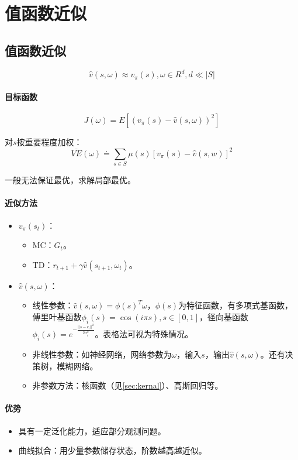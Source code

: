 \documentclass[
12pt, %
a4paper, 
oneside, %
headinclude,footinclude, %
]{scrartcl}
\begin{document}
\section{值函数近似}
\subsection[值函数近似]{值函数近似}
$$ \hat{v}(s, \omega) \approx v_{\pi}(s), \omega \in R^d, d \ll |S| $$
\paragraph{目标函数}
$$ J(\omega) = E[(v_{\pi}(s) - \hat{v}(s, \omega))^2] $$

对$ s $按重要程度加权：
$$ \overline{VE}(\omega) \doteq \sum_{s \in S} \mu(s) [v_\pi(s) - \hat{v}(s, w)]^2 $$

一般无法保证最优，求解局部最优。
\paragraph{近似方法}\label{sec:kernal back}
\begin{itemize}
\item $ v_\pi(s_t) $：
\begin{itemize}
\item MC：$ G_t $。
\item TD：$ r_{t + 1} + \gamma \hat{v}(s_{t + 1}, \omega_t) $。
\end{itemize}
\item $ \hat{v}(s, \omega) $：
\begin{itemize}
\item 线性参数：$ \hat{v}(s, \omega) = \phi(s)^T \omega $，$ \phi(s) $为特征函数，有多项式基函数，傅里叶基函数$ \phi_i(s) = \cos(i \pi s), s \in [0, 1] $，径向基函数$ \phi_i(s) = e^{-\frac{||s - c_i||^2}{2\sigma_i^2}} $。表格法可视为特殊情况。
\item 非线性参数：如神经网络，网络参数为$ \omega $，输入$ s $，输出$ \hat{v}(s, \omega) $。还有决策树，模糊网络。
\item 非参数方法：核函数（见\ref{sec:kernal}）、高斯回归等。
\end{itemize}
\end{itemize}
\paragraph{优势}
\begin{itemize}
\item 具有一定泛化能力，适应部分观测问题。
\item 曲线拟合：用少量参数储存状态，阶数越高越近似。
\end{itemize}
\end{document}
